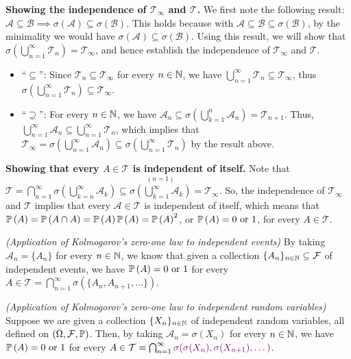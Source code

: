 \begin{enumerate}
\begin{pf}
\textbf{Showing the independence of \(\mathcal{T}_{\infty}\) and
\(\mathcal{T}\).} We first note the following result: \(\mathcal{A}\subseteq
\mathcal{B}\implies \sigma(\mathcal{A})\subseteq \sigma(\mathcal{B})\). This
holds because with \(\mathcal{A}\subseteq \mathcal{B}\subseteq
\sigma(\mathcal{B})\), by the minimality we would have
\(\sigma(\mathcal{A})\subseteq \sigma(\mathcal{B})\). Using this result, we will
show that \(\sigma(\bigcup_{n=1}^{\infty}\mathcal{T}_n)=\mathcal{T}_{\infty}\),
and hence establish the independence of \(\mathcal{T}_{\infty}\) and
\(\mathcal{T}\).
\begin{itemize}
\item ``\(\subseteq\)'': Since \(\mathcal{T}_n\subseteq \mathcal{T}_{\infty}\) for every \(n\in\mathbb{N}\),
we have \(\bigcup_{n=1}^{\infty}\mathcal{T}_n\subseteq \mathcal{T}_{\infty}\), thus
\(\sigma(\bigcup_{n=1}^{\infty}\mathcal{T}_n)\subseteq \mathcal{T}_{\infty}\).
\item ``\(\supseteq\)'': For every \(n\in\mathbb{N}\), we have \(\mathcal{A}_n\subseteq
\sigma(\bigcup_{k=1}^{n}\mathcal{A}_n)=\mathcal{T}_{n+1}\). Thus,
\(\bigcup_{n=1}^{\infty}\mathcal{A}_n\subseteq
\bigcup_{n=1}^{\infty}\mathcal{T}_{n}\), which implies that
\(\mathcal{T}_{\infty}=\sigma(\bigcup_{n=1}^{\infty}\mathcal{A}_n) \subseteq
\sigma(\bigcup_{n=1}^{\infty}\mathcal{T}_n)\) by the result above.
\end{itemize}
\textbf{Showing that every \(A\in\mathcal{T}\) is independent of itself.}
Note that \(\mathcal{T}=\bigcap_{n=1}^{\infty}\sigma(\bigcup_{k=n}^{\infty}\mathcal{A}_k)
\subseteq \overset{(n=1)}{\sigma(\bigcup_{k=1}^{\infty}\mathcal{A}_k)}
=\mathcal{T}_{\infty}\). So, the independence of \(\mathcal{T}_{\infty}\) and
\(\mathcal{T}\) implies that every \(\mathcal{A}\in\mathcal{T}\) is independent of itself,
which means that \(\mathbb{P}\left(A\right)=\mathbb{P}\left(A\cap A\right)=\mathbb{P}\left(A\right)\mathbb{P}\left(A\right)=\mathbb{P}\left(A\right)^{2}\), or
\(\mathbb{P}\left(A\right)=0\text{ or }1\), for every \(A\in\mathcal{T}\).
\end{pf}
\begin{remark}
\item \emph{(Application of Kolmogorov's zero-one law to independent events)}
By taking \(\mathcal{A}_n=\{A_n\}\) for every \(n\in\mathbb{N}\), we know that given a
collection \(\{A_n\}_{n\in\mathbb{N}}\subseteq \mathcal{F}\) of independent events, we have
\(\mathbb{P}\left(A\right)=0\text{ or }1\) for every \(A\in\mathcal{T}=\bigcap_{n=1}^{\infty}\sigma(\{A_n,A_{n+1},\dotsc\})\).
\item \emph{(Application of Kolmogorov's zero-one law to independent random
variables)} Suppose we are given a collection \(\{X_n\}_{n\in\mathbb{N}}\) of
independent random variables, all defined on \((\Omega,\mathcal{F},\mathbb{P})\).
Then, by taking \(\mathcal{A}_n=\sigma(X_n)\) for every \(n\in\mathbb{N}\), we have
\(\mathbb{P}\left(A\right)=0\text{ or }1\) for every
\(A\in\mathcal{T}=\bigcap_{n=1}^{\infty}\vc{\sigma(\sigma(X_n),\sigma(X_{n+1}),\dotsc)}\).


\end{remark}
\end{enumerate}
